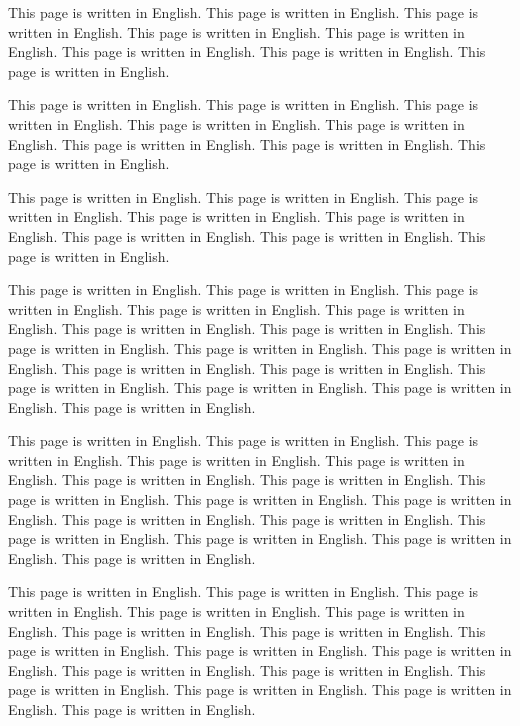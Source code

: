 \documentclass[12pt]{article} %
\begin{document}
This page is written in English. This page is written in English. 
This page is written in English. This page is written in English. 
This page is written in English. This page is written in English. 
This page is written in English. This page is written in English. 

This page is written in English. This page is written in English. 
This page is written in English. This page is written in English. 
This page is written in English. This page is written in English. 
This page is written in English. This page is written in English. 

This page is written in English. This page is written in English. 
This page is written in English. This page is written in English. 
This page is written in English. This page is written in English. 
This page is written in English. This page is written in English. 

This page is written in English. This page is written in English. 
This page is written in English. This page is written in English. 
This page is written in English. This page is written in English. 
This page is written in English. This page is written in English. 
This page is written in English. This page is written in English. 
This page is written in English. This page is written in English. 
This page is written in English. This page is written in English. 
This page is written in English. This page is written in English. 

This page is written in English. This page is written in English. 
This page is written in English. This page is written in English. 
This page is written in English. This page is written in English. 
This page is written in English. This page is written in English. 
This page is written in English. This page is written in English. 
This page is written in English. This page is written in English. 
This page is written in English. This page is written in English. 
This page is written in English. This page is written in English. 

This page is written in English. This page is written in English. 
This page is written in English. This page is written in English. 
This page is written in English. This page is written in English. 
This page is written in English. This page is written in English. 
This page is written in English. This page is written in English. 
This page is written in English. This page is written in English. 
This page is written in English. This page is written in English. 
This page is written in English. This page is written in English. 
\end{document}
